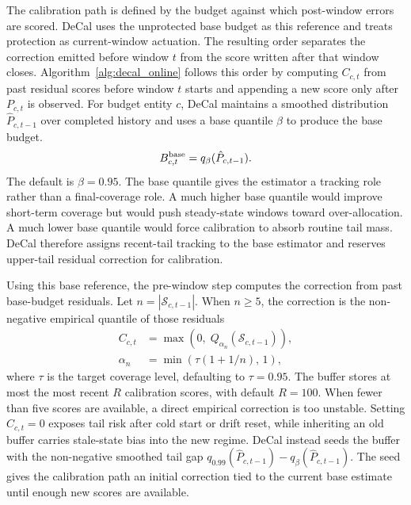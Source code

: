 \documentclass[sigplan,10pt, anonymous]{acmart}
\begin{document}
The calibration path is defined by the budget against which post-window errors are scored. DeCal uses the unprotected base budget as this reference and treats protection as current-window actuation. The resulting order separates the correction emitted before window $t$ from the score written after that window closes. Algorithm~\ref{alg:decal_online} follows this order by computing $C_{c,t}$ from past residual scores before window $t$ starts and appending a new score only after $P_{c,t}$ is observed. For budget entity $c$, DeCal maintains a smoothed distribution $\hat{P}_{c,t-1}$ over completed history and uses a base quantile $\beta$ to produce the base budget.
\begin{equation}
\label{eq:base_budget}
B_{c,t}^{\rm base}=q_{\beta}(\hat{P}_{c,t-1}).
\end{equation}
The default is $\beta=0.95$. The base quantile gives the estimator a tracking role rather than a final-coverage role. A much higher base quantile would improve short-term coverage but would push steady-state windows toward over-allocation. A much lower base quantile would force calibration to absorb routine tail mass. DeCal therefore assigns recent-tail tracking to the base estimator and reserves upper-tail residual correction for calibration.

Using this base reference, the pre-window step computes the correction from past base-budget residuals. Let $n=|\mathcal{S}_{c,t-1}|$. When $n\ge5$, the correction is the non-negative empirical quantile of those residuals
\begin{equation}
\label{eq:calibration_correction}
\begin{aligned}
C_{c,t}
&= \max\!\left(0,\;Q_{\alpha_n}(\mathcal{S}_{c,t-1})\right), \\
\alpha_n
&= \min\!\left(\tau(1+1/n),\,1\right),
\end{aligned}
\end{equation}
where $\tau$ is the target coverage level, defaulting to $\tau=0.95$. The buffer stores at most the most recent $R$ calibration scores, with default $R=100$. When fewer than five scores are available, a direct empirical correction is too unstable. Setting $C_{c,t}=0$ exposes tail risk after cold start or drift reset, while inheriting an old buffer carries stale-state bias into the new regime. DeCal instead seeds the buffer with the non-negative smoothed tail gap $q_{0.99}(\hat{P}_{c,t-1})-q_{\beta}(\hat{P}_{c,t-1})$. The seed gives the calibration path an initial correction tied to the current base estimate until enough new scores are available.
\end{document}
